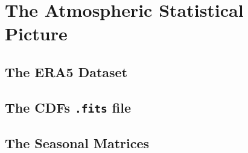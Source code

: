 \chapter{The Atmospheric Statistical Picture}

\section{The ERA5 Dataset}
\section{The CDFs \texttt{.fits} file}
\section{The Seasonal Matrices}
